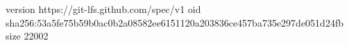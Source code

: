 version https://git-lfs.github.com/spec/v1
oid sha256:53a5fe75b59b0ac0b2a08582ee6151120a203836ce457ba735e297de051d24fb
size 22002
